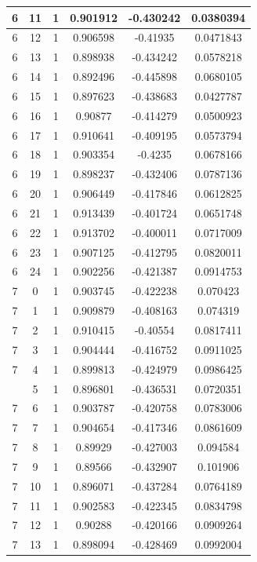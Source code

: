 \documentclass[12pt,a4paper]{article}
\numberwithin{equation}{section}
\numberwithin{figure}{section}
\numberwithin{table}{section}
\begin{document}
\begin{longtable}{|c|c|c|c|c|c|}
6 & 11 & 1 & 0.901912 & -0.430242 & 0.0380394 \\ \hline
6 & 12 & 1 & 0.906598 & -0.41935 & 0.0471843 \\ \hline
6 & 13 & 1 & 0.898938 & -0.434242 & 0.0578218 \\ \hline
6 & 14 & 1 & 0.892496 & -0.445898 & 0.0680105 \\ \hline
6 & 15 & 1 & 0.897623 & -0.438683 & 0.0427787 \\ \hline
6 & 16 & 1 & 0.90877 & -0.414279 & 0.0500923 \\ \hline
6 & 17 & 1 & 0.910641 & -0.409195 & 0.0573794 \\ \hline
6 & 18 & 1 & 0.903354 & -0.4235 & 0.0678166 \\ \hline
6 & 19 & 1 & 0.898237 & -0.432406 & 0.0787136 \\ \hline
6 & 20 & 1 & 0.906449 & -0.417846 & 0.0612825 \\ \hline
6 & 21 & 1 & 0.913439 & -0.401724 & 0.0651748 \\ \hline
6 & 22 & 1 & 0.913702 & -0.400011 & 0.0717009 \\ \hline
6 & 23 & 1 & 0.907125 & -0.412795 & 0.0820011 \\ \hline
6 & 24 & 1 & 0.902256 & -0.421387 & 0.0914753 \\ \hline
7 & 0 & 1 & 0.903745 & -0.422238 & 0.070423 \\ \hline
7 & 1 & 1 & 0.909879 & -0.408163 & 0.074319 \\ \hline
7 & 2 & 1 & 0.910415 & -0.40554 & 0.0817411 \\ \hline
7 & 3 & 1 & 0.904444 & -0.416752 & 0.0911025 \\ \hline
7 & 4 & 1 & 0.899813 & -0.424979 & 0.0986425 \\ \hline
\pagebreak
7 & 5 & 1 & 0.896801 & -0.436531 & 0.0720351 \\ \hline
7 & 6 & 1 & 0.903787 & -0.420758 & 0.0783006 \\ \hline
7 & 7 & 1 & 0.904654 & -0.417346 & 0.0861609 \\ \hline
7 & 8 & 1 & 0.89929 & -0.427003 & 0.094584 \\ \hline
7 & 9 & 1 & 0.89566 & -0.432907 & 0.101906 \\ \hline
7 & 10 & 1 & 0.896071 & -0.437284 & 0.0764189 \\ \hline
7 & 11 & 1 & 0.902583 & -0.422345 & 0.0834798 \\ \hline
7 & 12 & 1 & 0.90288 & -0.420166 & 0.0909264 \\ \hline
7 & 13 & 1 & 0.898094 & -0.428469 & 0.0992004 \\ \hline

\end{longtable}
\end{document}
